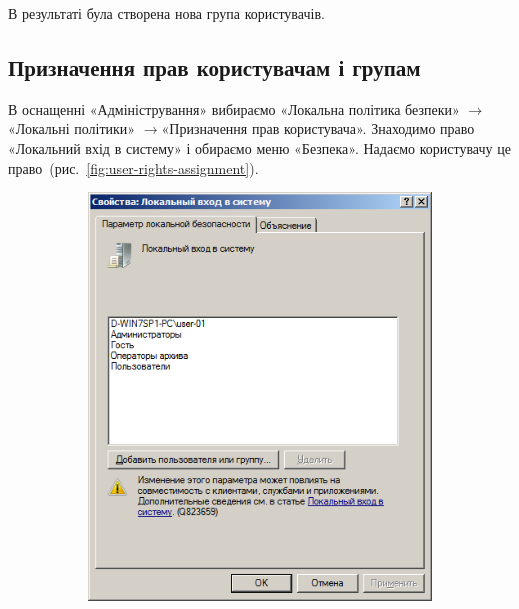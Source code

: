 \documentclass[
	a4paper,
	oneside,
	DIV = 12,
	fontsize = 13pt,
	headings = normal,
]{scrartcl}
\newcommand{\Mytextrightarrow}{$\rightarrow$\hspace{0.25em}}
\begin{document}
			В результаті була створена нова група користувачів.

		\subsection{Призначення прав користувачам і групам}
			В оснащенні «Адміністрування» вибираємо «Локальна політика безпеки» \Mytextrightarrow «Локальні політики» \Mytextrightarrow «Призначення прав користувача». Знаходимо право «Локальний вхід в систему» і обираємо меню «Безпека». Надаємо користувачу це право~(рис.~\ref{fig:user-rights-assignment}).

			\begin{figure}[!htbp]
				\begin{subfigure}[t]{0.5\columnwidth}
					\centering
					\includegraphics[height = 11\baselineskip]{../01-solution/y03s01-pcdiag-lab-08-p09.png}
					\caption{}
					\label{}
				\end{subfigure}%
				\begin{subfigure}[t]{0.5\columnwidth}
					\centering

\end{subfigure}
\end{figure}
\end{document}
